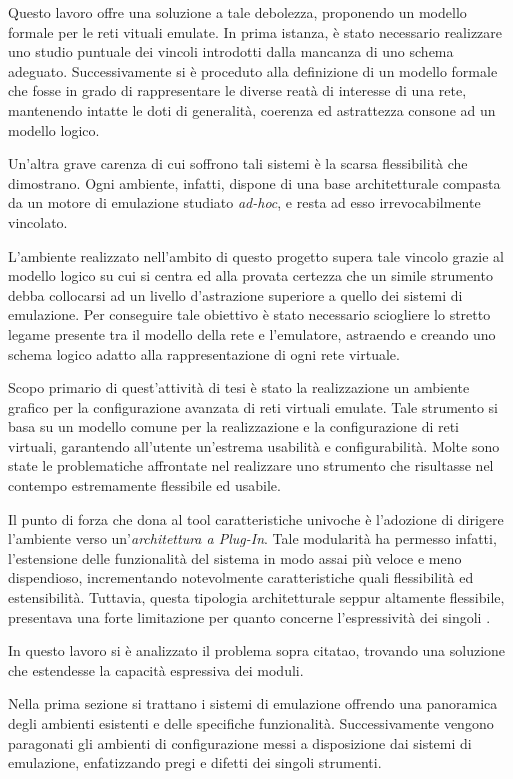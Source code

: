 Questo lavoro offre una soluzione a tale debolezza, proponendo un modello formale per le reti vituali emulate.
In prima istanza, è stato necessario realizzare uno studio puntuale dei vincoli introdotti dalla mancanza di uno schema adeguato. Successivamente si è proceduto alla definizione di un modello formale che fosse in grado di rappresentare le diverse reatà di interesse di una rete, mantenendo intatte le doti di generalità, coerenza ed astrattezza consone ad un modello logico.

Un'altra grave carenza di cui soffrono tali sistemi è la scarsa flessibilità che dimostrano. Ogni ambiente, infatti, dispone di una base architetturale compasta da un motore di emulazione studiato \emph{ad-hoc}, e resta ad esso irrevocabilmente vincolato.

L'ambiente realizzato nell'ambito di questo progetto supera tale vincolo grazie al modello logico su cui si centra ed alla provata certezza che un simile strumento debba collocarsi ad un livello d'astrazione superiore a quello dei sistemi di emulazione.
Per conseguire tale obiettivo è stato necessario sciogliere lo stretto legame presente tra il modello della rete e l'emulatore, astraendo e creando uno schema logico adatto alla rappresentazione di ogni rete virtuale.

Scopo primario di quest'attività di tesi è stato la realizzazione un ambiente grafico per la configurazione avanzata di reti virtuali emulate.
Tale strumento si basa su un modello comune per la realizzazione e la configurazione di reti virtuali, garantendo all'utente un'estrema usabilità e configurabilità.
Molte sono state le problematiche affrontate nel realizzare uno strumento che risultasse nel contempo estremamente flessibile ed usabile.

Il punto di forza che dona al tool caratteristiche univoche è l'adozione di dirigere l'ambiente verso un'\emph{architettura a Plug-In}. Tale modularità ha permesso infatti, l'estensione delle funzionalità del sistema in modo assai più veloce e meno dispendioso, incrementando notevolmente caratteristiche quali flessibilità ed estensibilità.
Tuttavia, questa tipologia architetturale seppur altamente flessibile, presentava una forte limitazione per quanto concerne l'espressività dei singoli \plugin{}. 

In questo lavoro si è analizzato il problema sopra citatao, trovando una soluzione che estendesse la capacità espressiva dei moduli.


Nella prima sezione si trattano i sistemi di emulazione offrendo una panoramica degli ambienti esistenti e delle specifiche funzionalità. Successivamente vengono paragonati gli ambienti di configurazione messi a disposizione dai sistemi di emulazione, enfatizzando pregi e difetti dei singoli strumenti.

